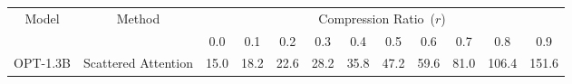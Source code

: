 \begin{table}[th]
\small
\centering
\begin{tabular}{c|c|cccccccccc}
\toprule
  \multirow{2}{*}{Model}        & \multirow{2}{*}{Method} & \multicolumn{10}{c}{Compression Ratio~($r$)}                                                                                                                                                                         \\
                              &                 & \multicolumn{1}{c}{0.0}  & \multicolumn{1}{c}{0.1}      & \multicolumn{1}{c}{0.2} & \multicolumn{1}{c}{0.3} & \multicolumn{1}{c}{0.4} & \multicolumn{1}{c}{0.5} & \multicolumn{1}{c}{0.6} & \multicolumn{1}{c}{0.7} & \multicolumn{1}{c}{0.8} & \multicolumn{1}{c}{0.9} \\
\midrule
  \multirow{3}{*}{OPT-1.3B}     & Scattered Attention  & \multicolumn{1}{c}{15.0}  & \multicolumn{1}{c}{18.2} & \multicolumn{1}{c}{22.6}    & \multicolumn{1}{c}{28.2}    & \multicolumn{1}{c}{35.8}    & \multicolumn{1}{c}{47.2}    & \multicolumn{1}{c}{59.6}    & \multicolumn{1}{c}{81.0}    & \multicolumn{1}{c}{106.4}    & \multicolumn{1}{c}{151.6}    \\


\end{tabular}
\end{table}
